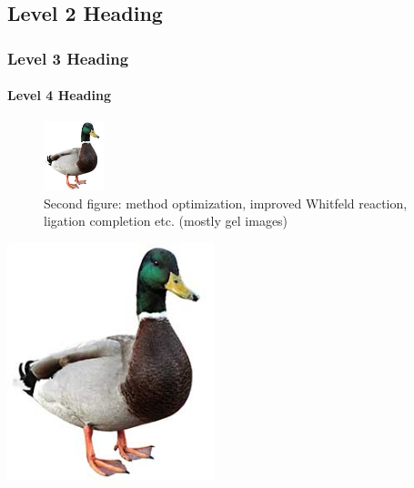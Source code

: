 \documentclass[9pt,lineno]{elife}
\begin{document}
\subsection{Level 2 Heading}

\lipsum[3]

\subsubsection{Level 3 Heading}

\lipsum[5]

\paragraph{Level 4 Heading}
\lipsum[7]









\begin{figure}[ht!]
\centering
\includegraphics[height=2cm]{figures/duck.jpg}
\caption{
Second figure: method optimization, improved Whitfeld reaction, ligation completion etc. (mostly gel images)
}
\label{fig:fig2}
\end{figure}

{\includegraphics[width=6cm]{figures/duck.jpg}}\label{figsupp:sfig2_1}
\end{document}
